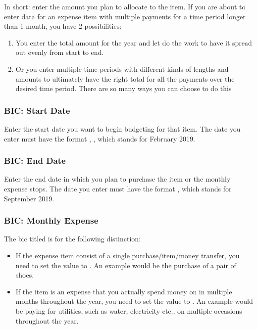 In short: enter the amount you plan to allocate to the item.
If you are about to enter data for an expense item with multiple payments for a time period longer than 1 month, you have 2 possibilities:
\begin{enumerate}
	\item You enter the total amount for the year and let \tfn do the work to have it spread out evenly from start to end.
	\item Or you enter multiple time periods with different kinds of lengths and amounts to ultimately have the right total for all the payments over the desired time period.
	There are so many ways you can choose to do this
\end{enumerate}

\subsubsection{BIC: Start Date}
\label{subsubsec:budgeting-item-column-start-date}

Enter the start date you want to begin budgeting for that item.
The date you enter must have the format , \eg {}, which stands for February 2019.

\subsubsection{BIC: End Date}
\label{subsubsec:budgeting-item-column-end-date}

Enter the end date in which you plan to purchase the item or the monthly expense stops.
The date you enter must have the format , \eg {} which stands for September 2019.

\subsubsection{BIC: Monthly Expense}
\label{subsubsec:budgeting-item-column-monthly-expense}

The \ac{bic} titled  is for the following distinction:
\begin{itemize}
	\item If the expense item consist of a single purchase/item/money transfer, you need to set the value to .
	An example would be the purchase of a pair of shoes.
	\item If the item is an expense that you actually spend money on in multiple months throughout the year, you need to set the value to .
	An example would be paying for \eg utilities, such as water, electricity etc., on multiple occasions throughout the year.
\end{itemize}

